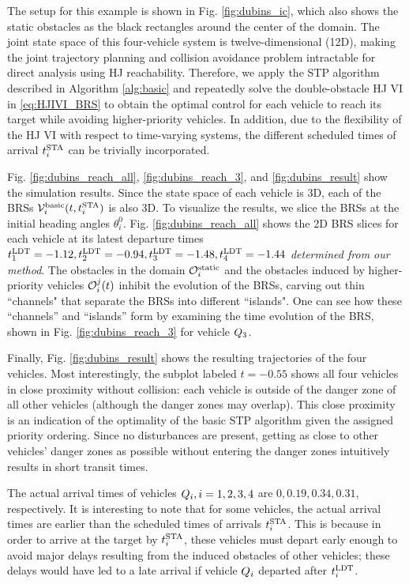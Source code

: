 The setup for this example is shown in Fig. \ref{fig:dubins_ic}, which also shows the static obstacles as the black rectangles around the center of the domain. The joint state space of this four-vehicle system is twelve-dimensional (12D), making the joint trajectory planning and collision avoidance problem intractable for direct analysis using HJ reachability. Therefore, we apply the STP algorithm described in Algorithm \ref{alg:basic} and repeatedly solve the double-obstacle HJ VI in \eqref{eq:HJIVI_BRS} to obtain the optimal control for each vehicle to reach its target while avoiding higher-priority vehicles. In addition, due to the flexibility of the HJ VI with respect to time-varying systems, the different scheduled times of arrival $t^\text{STA}_i$ can be trivially incorporated. 

Fig. \ref{fig:dubins_reach_all}, \ref{fig:dubins_reach_3}, and \ref{fig:dubins_result} show the simulation results. Since the state space of each vehicle is 3D, each of the BRSs $\mathcal{V}_i^\text{basic}(t, t^\text{STA}_i)$ is also 3D. To visualize the results, we slice the BRSs at the initial heading angles $\theta_i^0$. Fig. \ref{fig:dubins_reach_all} shows the 2D BRS slices for each vehicle at its latest departure times $t^\text{LDT}_1=-1.12, t^\text{LDT}_2=-0.94,t^\text{LDT}_3=-1.48,t^\text{LDT}_4=-1.44$ \textit{determined from our method}. The obstacles in the domain $\mathcal{O}^\text{static}_i$ and the obstacles induced by higher-priority vehicles $\mathcal{O}_i^j(t)$ inhibit the evolution of the BRSs, carving out thin ``channels" that separate the BRSs into different ``islands". One can see how these ``channels'' and ``islands'' form by examining the time evolution of the BRS, shown in Fig. \ref{fig:dubins_reach_3} for vehicle $Q_3$. 

Finally, Fig. \ref{fig:dubins_result} shows the resulting trajectories of the four vehicles. Most interestingly, the subplot labeled $t=-0.55$ shows all four vehicles in close proximity without collision: each vehicle is outside of the danger zone of all other vehicles (although the danger zones may overlap). This close proximity is an indication of the optimality of the basic STP algorithm given the assigned priority ordering. Since no disturbances are present, getting as close to other vehicles' danger zones as possible without entering the danger zones intuitively results in short transit times.

The actual arrival times of vehicles $Q_i,i=1,2,3,4$ are $0, 0.19, 0.34, 0.31$, respectively. It is interesting to note that for some vehicles, the actual arrival times are earlier than the scheduled times of arrivals $t^\text{STA}_i$. This is because in order to arrive at the target by $t^\text{STA}_i$, these vehicles must depart early enough to avoid major delays resulting from the induced obstacles of other vehicles; these delays would have led to a late arrival if vehicle $Q_i$ departed after $t^\text{LDT}_i$.

